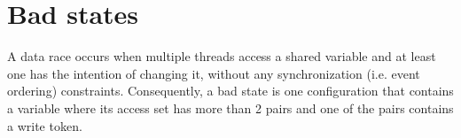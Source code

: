 \section{Bad states}

\smallskip\noindent%
\begin{minipage}{0.7\textwidth}
  \setlength{\parindent}{1em}%
  A data race occurs when multiple threads access a shared variable
  and at least one has the intention of changing it, without any
  synchronization (i.e. event ordering) constraints. Consequently, a
  bad state is one configuration that contains a variable where its
  access set has more than 2 pairs and one of the pairs contains a
  write token.
\end{minipage}
%
%
\hfill%
\begin{minipage}{0.29\textwidth}
\begin{center}
\end{center}
\end{minipage}
